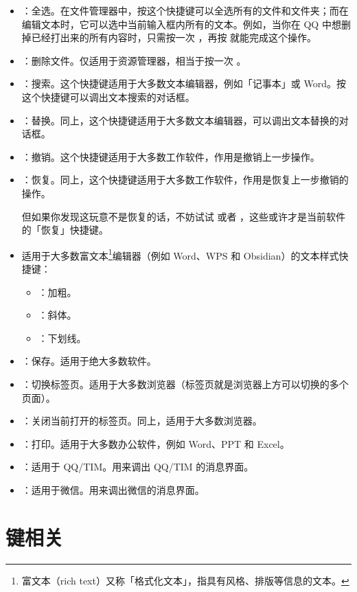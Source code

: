 \begin{itemize}
  \item {}：全选。在文件管理器中，按这个快捷键可以全选所有的文件和文件夹；而在编辑文本时，它可以选中当前输入框内所有的文本。例如，当你在 QQ 中想删掉已经打出来的所有内容时，只需按一次 ，再按  就能完成这个操作。
  \item {}：删除文件。仅适用于资源管理器，相当于按一次 。
  \item {}：搜索。这个快捷键适用于大多数文本编辑器，例如「记事本」或 Word。按这个快捷键可以调出文本搜索的对话框。
  \item {}：替换。同上，这个快捷键适用于大多数文本编辑器，可以调出文本替换的对话框。
  \item {}：撤销。这个快捷键适用于大多数工作软件，作用是撤销上一步操作。
  \item {}：恢复。同上，这个快捷键适用于大多数工作软件，作用是恢复上一步撤销的操作。
  
  但如果你发现这玩意不是恢复的话，不妨试试  或者 ，这些或许才是当前软件的「恢复」快捷键。

  \item 适用于大多数富文本\footnote{富文本（rich text）又称「格式化文本」，指具有风格、排版等信息的文本。}编辑器（例如 Word、WPS 和 Obsidian）的文本样式快捷键：
  \begin{itemize}
    \item {}：加粗。
    \item {}：斜体。
    \item {}：下划线。
  \end{itemize}
  \item {}：保存。适用于绝大多数软件。
  \item {}：切换标签页。适用于大多数浏览器（标签页就是浏览器上方可以切换的多个页面）。
  \item {}：关闭当前打开的标签页。同上，适用于大多数浏览器。
  \item {}：打印。适用于大多数办公软件，例如 Word、PPT 和 Excel。
  \item {}：适用于 QQ/TIM。用来调出 QQ/TIM 的消息界面。
  \item {}：适用于微信。用来调出微信的消息界面。
\end{itemize}

\section{ 键相关}

